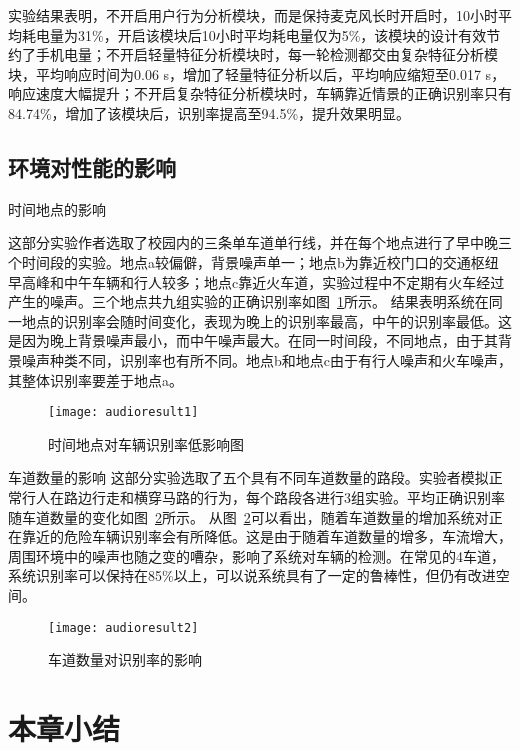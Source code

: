 实验结果表明，不开启用户行为分析模块，而是保持麦克风长时开启时，10小时平均耗电量为31\%，开启该模块后10小时平均耗电量仅为5\%，该模块的设计有效节约了手机电量；不开启轻量特征分析模块时，每一轮检测都交由复杂特征分析模块，平均响应时间为0.06 s，增加了轻量特征分析以后，平均响应缩短至0.017 s，响应速度大幅提升；不开启复杂特征分析模块时，车辆靠近情景的正确识别率只有84.74\%，增加了该模块后，识别率提高至94.5\%，提升效果明显。


\subsection{环境对性能的影响}
时间地点的影响

这部分实验作者选取了校园内的三条单车道单行线，并在每个地点进行了早中晚三个时间段的实验。地点a较偏僻，背景噪声单一；地点b为靠近校门口的交通枢纽早高峰和中午车辆和行人较多；地点c靠近火车道，实验过程中不定期有火车经过产生的噪声。三个地点共九组实验的正确识别率如图~\ref{fig:audioresult1}所示。
结果表明系统在同一地点的识别率会随时间变化，表现为晚上的识别率最高，中午的识别率最低。这是因为晚上背景噪声最小，而中午噪声最大。在同一时间段，不同地点，由于其背景噪声种类不同，识别率也有所不同。地点b和地点c由于有行人噪声和火车噪声，其整体识别率要差于地点a。

\begin{figure}[htbp] %
  \centering
  \texttt{[image: audioresult1]}
  \caption{时间地点对车辆识别率低影响图}
  \label{fig:audioresult1}
\end{figure}

车道数量的影响
这部分实验选取了五个具有不同车道数量的路段。实验者模拟正常行人在路边行走和横穿马路的行为，每个路段各进行3组实验。平均正确识别率随车道数量的变化如图~\ref{fig:audioresult2}所示。
从图~\ref{fig:audioresult2}可以看出，随着车道数量的增加系统对正在靠近的危险车辆识别率会有所降低。这是由于随着车道数量的增多，车流增大，周围环境中的噪声也随之变的嘈杂，影响了系统对车辆的检测。在常见的4车道，系统识别率可以保持在85\%以上，可以说系统具有了一定的鲁棒性，但仍有改进空间。

\begin{figure}[htbp] %
  \centering
  \texttt{[image: audioresult2]}
  \caption{车道数量对识别率的影响}
  \label{fig:audioresult2}
\end{figure}

\section{本章小结}

